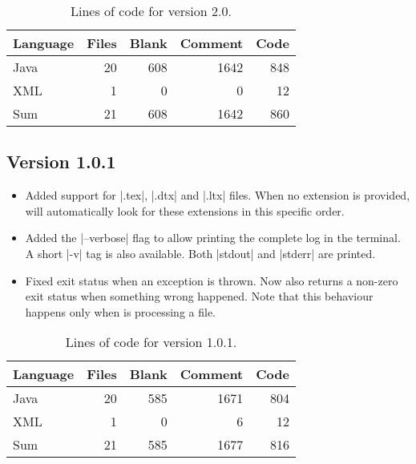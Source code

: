 \documentclass[a4paper,twoside,12pt]{memoir}
\begin{document}
{\renewcommand{\arraystretch}{1.5}
\begin{table}[ht]
\centering
\caption{Lines of code for version 2.0.}
\begin{tabular}{lrrrr}
\hline
\textbf{Language} & \textbf{Files} & \textbf{Blank} & \textbf{Comment} & \textbf{Code}\\
\hline
\hline
Java & 20 & 608 & 1642 & 848\\
XML & 1 & 0 & 0 & 12\\
\hline
Sum & 21 & 608 & 1642 & 860\\
\hline
\end{tabular}
\label{tab:locarara20}
\end{table}}

\subsection*{Version 1.0.1}

\begin{itemize}
\item[\newfeature] 
     Added support for |.tex|, |.dtx| and |.ltx| files. When no extension is 
     provided, \arara will automatically look for these extensions in this 
     specific order.
\item[\newfeature] 
     Added the |--verbose| flag to allow printing the complete log in the 
     terminal. A short |-v| tag is also available. Both |stdout| and |stderr| 
     are printed.
\item[\bugfix] 
     Fixed exit status when an exception is thrown. Now \arara also returns a 
     non-zero exit status when something wrong happened. Note that this 
     behaviour happens only when \arara is processing a file.
\end{itemize}

{\renewcommand{\arraystretch}{1.5}
\begin{table}[ht]
\centering
\caption{Lines of code for version 1.0.1.}
\begin{tabular}{lrrrr}
\hline
\textbf{Language} & \textbf{Files} & \textbf{Blank} & \textbf{Comment} & \textbf{Code}\\
\hline
\hline
Java & 20 & 585 & 1671 & 804\\
XML & 1 & 0 & 6 & 12\\
\hline
Sum & 21 & 585 & 1677 & 816\\
\hline
\end{tabular}
\label{tab:locarara101}
\end{table}}
\end{document}
